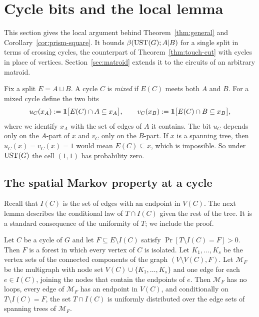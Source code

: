 \section{Cycle bits and the local lemma}\label{sec:trees}

This section gives the local argument behind Theorem~\ref{thm:general} and Corollary~\ref{cor:prism-square}. It bounds $\beta(\mathrm{UST}(G);A|B)$ for a single split in terms of crossing cycles, the counterpart of Theorem~\ref{thm:touch-cut} with cycles in place of vertices. Section~\ref{sec:matroid} extends it to the circuits of an arbitrary matroid.

Fix a split $E=A\sqcup B$. A cycle $C$ is \emph{mixed} if $E(C)$ meets both $A$ and $B$. For a mixed cycle define the two bits
\[
  u_C(x_A):=\mathbf{1}\bigl[E(C)\cap A\subseteq x_A\bigr],\qquad v_C(x_B):=\mathbf{1}\bigl[E(C)\cap B\subseteq x_B\bigr],
\]
where we identify $x_A$ with the set of edges of $A$ it contains. The bit $u_C$ depends only on the $A$-part of $x$ and $v_C$ only on the $B$-part. If $x$ is a spanning tree, then $u_C(x)=v_C(x)=1$ would mean $E(C)\subseteq x$, which is impossible. So under $\mathrm{UST}(G)$ the cell $(1,1)$ has probability zero.

\subsection{The spatial Markov property at a cycle}

Recall that $I(C)$ is the set of edges with an endpoint in $V(C)$. The next lemma describes the conditional law of $T\cap I(C)$ given the rest of the tree. It is a standard consequence of the uniformity of $T$; we include the proof.

\begin{lemma}\label{lem:contract}
Let $C$ be a cycle of $G$ and let $F\subseteq E\setminus I(C)$ satisfy $\Pr[T\setminus I(C)=F]>0$. Then $F$ is a forest in which every vertex of $C$ is isolated. Let $K_1,\dots,K_s$ be the vertex sets of the connected components of the graph $(V\setminus V(C),F)$. Let $\mathcal M_F$ be the multigraph with node set $V(C)\cup\{K_1,\dots,K_s\}$ and one edge for each $e\in I(C)$, joining the nodes that contain the endpoints of $e$. Then $\mathcal M_F$ has no loops, every edge of $\mathcal M_F$ has an endpoint in $V(C)$, and conditionally on $T\setminus I(C)=F$, the set $T\cap I(C)$ is uniformly distributed over the edge sets of spanning trees of $\mathcal M_F$.
\end{lemma}

